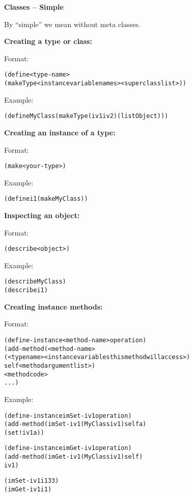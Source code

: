 \documentclass[12pt]{article}
\begin{document}
\bigskip

{\large \bfseries Classes -- Simple}

By ``simple'' we mean without meta classes.

\textbf{Creating a type or class:}

Format:

\begin{alltt}
   (define <type-name>
           (make Type <instance variable names> <superclass list>))
\end{alltt}

\newpage

Example:

\begin{alltt}
   (define MyClass (make Type (iv1 iv2) (list Object)))
\end{alltt}

\textbf{Creating an instance of a type:}

Format:

\begin{alltt}
   (make <your-type>)
\end{alltt}

Example:

\begin{alltt}
   (define i1 (make MyClass))
\end{alltt}

\textbf{Inspecting an object:}

Format:

\begin{alltt}
   (describe <object>)
\end{alltt}

Example:

\begin{alltt}
   (describe MyClass)
   (describe i1)
\end{alltt}


\textbf{Creating instance methods:}

Format:

\begin{alltt}
   (define-instance <method-name> operation)
   (add-method (<method-name>
                     (<type name>  <instance variables this method will access>)
                     self  <method argument list>)
               <method code>
               ...)
\end{alltt}

\newpage

Example:

\begin{alltt}
   (define-instance imSet-iv1 operation)
   (add-method (imSet-iv1 (MyClass iv1) self a)
               (set! iv1 a))
  
   (define-instance imGet-iv1 operation)
   (add-method (imGet-iv1 (MyClass iv1) self)
               iv1)

   (imSet-iv1 i1 33)
   (imGet-iv1 i1)
\end{alltt}
\end{document}
